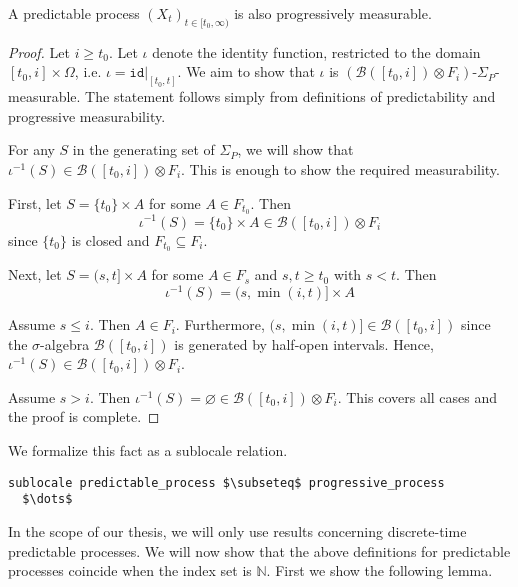 \begin{lemma}
	A predictable process $(X_t)_{t \in [t_0,\infty)}$ is also progressively measurable.
\end{lemma}
\begin{proof}
	Let $i \ge t_0$. Let $\iota$ denote the identity function, restricted to the domain $[t_0, i] \times \Omega$, i.e. $\iota = \texttt{id}\vert_{[t_0,t]}$. We aim to show that $\iota$ is $(\mathcal{B}([t_0,i]) \otimes F_i)$-$\Sigma_P$-measurable. The statement follows simply from definitions of predictability and progressive measurability.
	
	For any $S$ in the generating set of $\Sigma_P$, we will show that $\iota^{-1}(S) \in \mathcal{B}([t_0,i]) \otimes F_i$. This is enough to show the required measurability.
	
	First, let $S = \{t_0\} \times A$ for some $A \in F_{t_0}$.
	Then
	\[
		\iota^{-1}(S) = \{t_0\} \times A \in \mathcal{B}([t_0,i]) \otimes F_i
	\]
	since $\{t_0\}$ is closed and $F_{t_0} \subseteq F_i$.
	
	Next, let $S = (s,t] \times A$ for some $A \in F_s$ and $s, t \ge t_0$ with $s < t$.
	Then
	\[
		\iota^{-1}(S) = (s, \min(i, t)] \times A
	\]
	
	Assume $s \le i$. Then $A \in F_i$. Furthermore, $(s, \min(i, t)] \in \mathcal{B}([t_0,i])$ since the $\sigma$-algebra $\mathcal{B}([t_0,i])$ is generated by half-open intervals. 
	Hence, $\iota^{-1}(S) \in \mathcal{B}([t_0,i]) \otimes F_i$.
	
	Assume $s > i$. Then $\iota^{-1}(S) = \varnothing \in \mathcal{B}([t_0,i]) \otimes F_i$. This covers all cases and the proof is complete.
\end{proof}

We formalize this fact as a sublocale relation.

\begin{isalemma}
{\small
\begin{lstlisting}[style=isabelle]
sublocale predictable_process $\subseteq$ progressive_process
  $\dots$
\end{lstlisting}
}
\end{isalemma}

In the scope of our thesis, we will only use results concerning discrete-time predictable processes. We will now show that the above definitions for predictable processes coincide when the index set is $\mathbb{N}$. First we show the following lemma.

